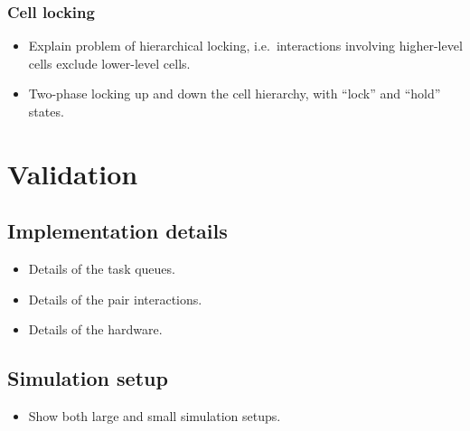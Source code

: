 \documentclass[final]{siamltex}
\begin{document}
\subsubsection{Cell locking}

\begin{itemize}

    \item Explain problem of hierarchical locking, i.e.~interactions
        involving higher-level cells exclude lower-level cells.
        
    \item Two-phase locking up and down the cell hierarchy, with
        ``lock'' and ``hold'' states.

\end{itemize}


\section{Validation}

\subsection{Implementation details}

\begin{itemize}

    \item Details of the task queues.
    
    \item Details of the pair interactions.
    
    \item Details of the hardware.
        
\end{itemize}


\subsection{Simulation setup}

\begin{itemize}

    \item Show both large and small simulation setups.
        
\end{itemize}
\end{document}
